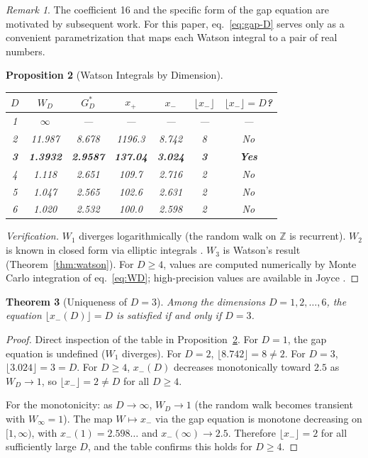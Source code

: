 \documentclass[12pt]{article}
\newtheorem{theorem}{Theorem}[section]
\newtheorem{proposition}[theorem]{Proposition}
\theoremstyle{definition}
\theoremstyle{remark}
\newtheorem{remark}[theorem]{Remark}
\begin{document}
\begin{remark}
The coefficient 16 and the specific form of the gap equation are motivated by subsequent work. For this paper, eq.~\eqref{eq:gap-D} serves only as a convenient parametrization that maps each Watson integral to a pair of real numbers.
\end{remark}

\begin{proposition}[Watson Integrals by Dimension]
\label{prop:WD}
\mbox{}
\begin{center}
\renewcommand{\arraystretch}{1.3}
\begin{tabular}{@{}ccccccc@{}}
\toprule
$D$ & $W_D$ & $G^*_D$ & $x_+$ & $x_-$ & $\lfloor x_- \rfloor$ & $\lfloor x_- \rfloor = D$? \\
\midrule
1 & $\infty$ & --- & --- & --- & --- & --- \\
2 & 11.987 & 8.678 & 1196.3 & 8.742 & 8 & No \\
\textbf{3} & \textbf{1.3932} & \textbf{2.9587} & \textbf{137.04} & \textbf{3.024} & \textbf{3} & \textbf{Yes} \\
4 & 1.118 & 2.651 & 109.7 & 2.716 & 2 & No \\
5 & 1.047 & 2.565 & 102.6 & 2.631 & 2 & No \\
6 & 1.020 & 2.532 & 100.0 & 2.598 & 2 & No \\
\bottomrule
\end{tabular}
\end{center}
\end{proposition}

\begin{proof}[Verification]
$W_1$ diverges logarithmically (the random walk on $\mathbb{Z}$ is recurrent). $W_2$ is known in closed form via elliptic integrals \cite{borwein-bailey}. $W_3$ is Watson's result (Theorem~\ref{thm:watson}). For $D \geq 4$, values are computed numerically by Monte Carlo integration of eq.~\eqref{eq:WD}; high-precision values are available in Joyce \cite{joyce2002}.
\end{proof}

\begin{theorem}[Uniqueness of $D = 3$]
\label{thm:d3}
Among the dimensions $D = 1, 2, \ldots, 6$, the equation $\lfloor x_-(D) \rfloor = D$ is satisfied if and only if $D = 3$.
\end{theorem}

\begin{proof}
Direct inspection of the table in Proposition~\ref{prop:WD}. For $D = 1$, the gap equation is undefined ($W_1$ diverges). For $D = 2$, $\lfloor 8.742 \rfloor = 8 \neq 2$. For $D = 3$, $\lfloor 3.024 \rfloor = 3 = D$. For $D \geq 4$, $x_-(D)$ decreases monotonically toward $2.5$ as $W_D \to 1$, so $\lfloor x_- \rfloor = 2 \neq D$ for all $D \geq 4$.

For the monotonicity: as $D \to \infty$, $W_D \to 1$ (the random walk becomes transient with $W_\infty = 1$). The map $W \mapsto x_-$ via the gap equation is monotone decreasing on $[1, \infty)$, with $x_-(1) = 2.598\ldots$ and $x_-(\infty) \to 2.5$. Therefore $\lfloor x_- \rfloor = 2$ for all sufficiently large $D$, and the table confirms this holds for $D \geq 4$.
\end{proof}
\end{document}
